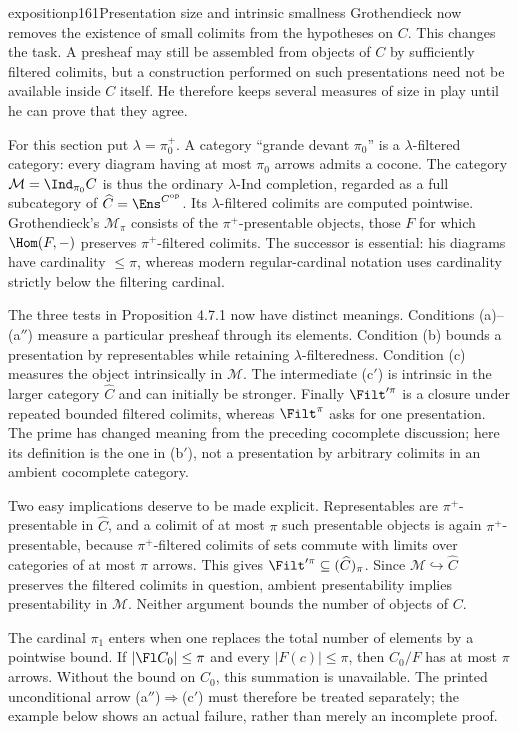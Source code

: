 \begin{dcomment}{exposition}{p161}{Presentation size and intrinsic smallness}
Grothendieck now removes the existence of small colimits from the hypotheses on $C$. This changes the task. A presheaf may still be assembled from objects of $C$ by sufficiently filtered colimits, but a construction performed on such presentations need not be available inside $C$ itself. He therefore keeps several measures of size in play until he can prove that they agree.

For this section put $\lambda=\pi_0^+$. A category ``grande devant $\pi_0$'' is a $\lambda$-filtered category: every diagram having at most $\pi_0$ arrows admits a cocone. The category $\mathcal M=\Ind_{\pi_0}C$ is thus the ordinary $\lambda$-Ind completion, regarded as a full subcategory of $\widehat C=\Ens^{C^{\mathrm{op}}}$. Its $\lambda$-filtered colimits are computed pointwise. Grothendieck's $\mathcal M_\pi$ consists of the $\pi^+$-presentable objects, those $F$ for which $\Hom(F,-)$ preserves $\pi^+$-filtered colimits. The successor is essential: his diagrams have cardinality $\leq\pi$, whereas modern regular-cardinal notation uses cardinality strictly below the filtering cardinal.

The three tests in Proposition 4.7.1 now have distinct meanings. Conditions (a)--(a$''$) measure a particular presheaf through its elements. Condition (b) bounds a presentation by representables while retaining $\lambda$-filteredness. Condition (c) measures the object intrinsically in $\mathcal M$. The intermediate (c$'$) is intrinsic in the larger category $\widehat C$ and can initially be stronger. Finally $\Filt'^\pi$ is a closure under repeated bounded filtered colimits, whereas $\Filt^\pi$ asks for one presentation. The prime has changed meaning from the preceding cocomplete discussion; here its definition is the one in (b$'$), not a presentation by arbitrary colimits in an ambient cocomplete category.

Two easy implications deserve to be made explicit. Representables are $\pi^+$-presentable in $\widehat C$, and a colimit of at most $\pi$ such presentable objects is again $\pi^+$-presentable, because $\pi^+$-filtered colimits of sets commute with limits over categories of at most $\pi$ arrows. This gives $\Filt'^\pi\subseteq(\widehat C)_\pi$. Since $\mathcal M\hookrightarrow\widehat C$ preserves the filtered colimits in question, ambient presentability implies presentability in $\mathcal M$. Neither argument bounds the number of objects of $C$.

The cardinal $\pi_1$ enters when one replaces the total number of elements by a pointwise bound. If $|\Fl C_0|\leq\pi$ and every $|F(c)|\leq\pi$, then $C_0/F$ has at most $\pi$ arrows. Without the bound on $C_0$, this summation is unavailable. The printed unconditional arrow (a$''$)$\Rightarrow$(c$'$) must therefore be treated separately; the example below shows an actual failure, rather than merely an incomplete proof.
\end{dcomment}

